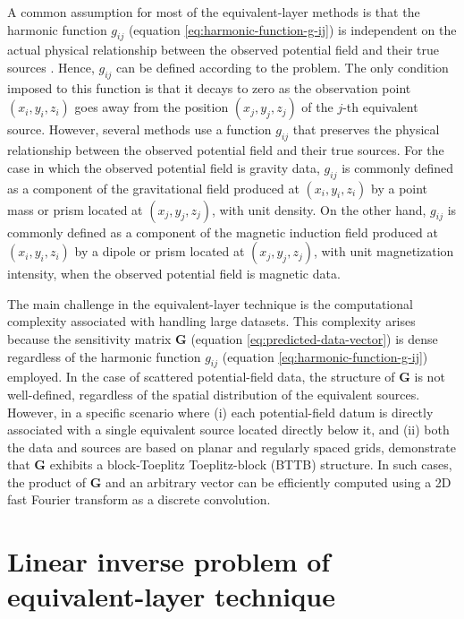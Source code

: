 A common assumption for most of the equivalent-layer methods is that the harmonic function $g_{ij}$ 
(equation \ref{eq:harmonic-function-g-ij}) is independent on the actual physical relationship between the
observed potential field and their true sources \cite[e.g.,][]{cordell1992, guspi-novara2009,li_etal_2014}.
Hence, $g_{ij}$ can be defined according to the problem.
The only condition imposed to this function is that it decays to zero as the observation point $(x_{i}, y_{i}, z_{i})$
goes away from the position $(x_{j}, y_{j}, z_{j})$ of the $j$-th equivalent source.
However, several methods use a function $g_{ij}$ that preserves the physical relationship between the
observed potential field and their true sources.
For the case in which the observed potential field is gravity data, $g_{ij}$ is commonly defined as a component of 
the gravitational field produced at $(x_{i}, y_{i}, z_{i})$ by a point mass or prism located at $(x_{j}, y_{j}, z_{j})$, with unit density.
On the other hand, $g_{ij}$ is commonly defined as a component of the 
magnetic induction field produced at $(x_{i}, y_{i}, z_{i})$ by a dipole or prism located at $(x_{j}, y_{j}, z_{j})$,
with unit magnetization intensity, when the observed potential field is magnetic data.

The main challenge in the equivalent-layer technique is the computational complexity associated with handling large datasets. 
This complexity arises because the sensitivity matrix $\mathbf{G}$ (equation \ref{eq:predicted-data-vector}) is dense regardless of the 
harmonic function $g_{ij}$ (equation \ref{eq:harmonic-function-g-ij}) employed. 
In the case of scattered potential-field data, the structure of $\mathbf{G}$  is not well-defined, regardless of the spatial distribution 
of the equivalent sources.
However, in a specific scenario where (i) each potential-field datum is directly associated with a single equivalent source located directly below it, 
and (ii) both the data and sources are based on planar and regularly spaced grids,  \citet{takahashi-etal2020,takahashi-etal2022} demonstrate that 
$\mathbf{G}$ exhibits a block-Toeplitz Toeplitz-block (BTTB) structure. 
In such cases, the product of $\mathbf{G}$ and an arbitrary vector can be efficiently computed using a 2D fast Fourier transform as a discrete convolution.

\section{Linear inverse problem of equivalent-layer technique}
\label{sec:linear-inverse-problem}

